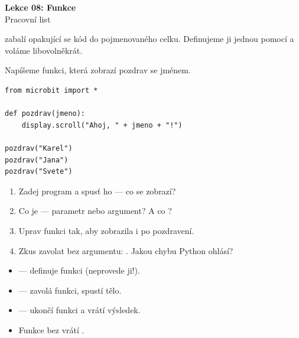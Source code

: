 \newcommand{\lekce}{Lekce 08 -- Pracovní list}




\begin{center}
  {\Large\bfseries\textcolor{microbit-blue}{Lekce 08: Funkce}}\\[4pt]
  {\large Pracovní list}
\end{center}

\medskip\noindent
{} zabalí opakující se kód do pojmenovaného celku.
Definujeme ji jednou pomocí  a voláme libovolněkrát.

\begin{ukol}

Napíšeme funkci, která zobrazí pozdrav se jménem.

\begin{lstlisting}
from microbit import *

def pozdrav(jmeno):
    display.scroll("Ahoj, " + jmeno + "!")

pozdrav("Karel")
pozdrav("Jana")
pozdrav("Svete")
\end{lstlisting}

\begin{enumerate}
  \item Zadej program a spusť ho — co se zobrazí?
  \item Co je  — parametr nebo argument? A co ?
  \item Uprav funkci tak, aby zobrazila i  po pozdravení.
  \item Zkus zavolat  bez argumentu: .
        Jakou chybu Python ohlásí?
\end{enumerate}

\odpoved[2cm]

\begin{tcolorbox}[colback=code-bg, colframe=gray!40,
                  fonttitle=\small\bfseries, title=Klíčové pojmy]
  \small
  \begin{itemize}[leftmargin=*]
    \item {} — definuje funkci (neprovede ji!).
    \item {} — zavolá funkci, spustí tělo.
    \item {} — ukončí funkci a vrátí výsledek.
    \item Funkce bez  vrátí .
  \end{itemize}
\end{tcolorbox}

\end{ukol}

